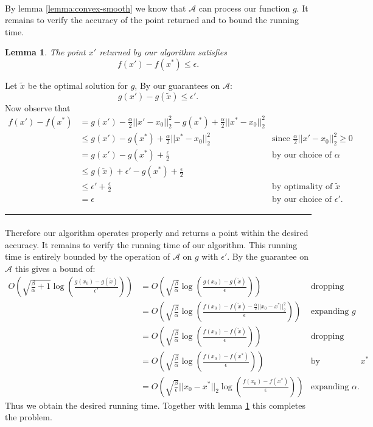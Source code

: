 \documentclass[letterpaper,12pt,oneside,onecolumn]{article}
\newcommand{\cA}{\mathcal{A}} \newcommand{\cB}{\mathcal{B}}
\newenvironment{proof}{{\bf Proof:  }}{\hfill\rule{2mm}{2mm}}
\newtheorem{lemma}[fact]{Lemma}
\begin{document}
\paragraph{}
By lemma \ref{lemma:convex-smooth} we know that $\cA$ can process our function $g$. It remains to verify the accuracy of the point returned and to bound the running time.
\begin{lemma}\label{lemma:q3-accuracy}
The point $x'$ returned by our algorithm satisfies
$$f(x') - f(x^*) \leq \epsilon.$$
\end{lemma}
\begin{proof}
Let $\tilde{x}$ be the optimal solution for $g$, By our guarantees on $\cA$:
$$g(x') - g(\tilde{x}) \leq \epsilon'.$$
Now observe that
\begin{align*}
f(x') - f(x^*) &= g(x') - \frac{\alpha}{2}||x'-x_0||^2_2 - g(x^*) +\frac{\alpha}{2}||x^*-x_0||_2^2 \\
&\leq g(x') - g(x^*) + \frac{\alpha}{2}||x^*-x_0||_2^2 &\text{since $\frac{\alpha}{2}||x'-x_0||^2_2\geq 0$} \\
&= g(x') - g(x^*) + \frac{\epsilon}{2} &\text{by our choice of $\alpha$} \\
&\leq g(\tilde{x}) + \epsilon' -g(x^*) + \frac{\epsilon}{2} \\
&\leq \epsilon' +\frac{\epsilon}{2} &\text{by optimality of $\tilde{x}$} \\
&= \epsilon &\text{by our choice of $\epsilon'$}.
\end{align*}
\end{proof}
\paragraph{}
Therefore our algorithm operates properly and returns a point within the desired accuracy. It remains to verify the running time of our algorithm. This running time is entirely bounded by the operation of $\cA$ on $g$ with $\epsilon'$. By the guarantee on $\cA$ this gives a bound of:
\begin{align*}
O(\sqrt{\frac{\beta}{\alpha} + 1}\log (\frac{g(x_0)-g(\tilde{x})}{\epsilon'})) &= O(\sqrt{\frac{\beta}{\alpha}}\log (\frac{g(x_0)-g(\tilde{x})}{\epsilon})) &\text{dropping constants}\\
&= O(\sqrt{\frac{\beta}{\alpha}}\log (\frac{f(x_0)-f(\tilde{x}) - \frac{\alpha}{2}||x_0-x^*||^2_2}{\epsilon})) &\text{expanding $g$}\\
&= O(\sqrt{\frac{\beta}{\alpha}}\log (\frac{f(x_0)-f(\tilde{x})}{\epsilon})) &\text{dropping non-positive term} \\
&= O(\sqrt{\frac{\beta}{\alpha}}\log (\frac{f(x_0)-f(x^*)}{\epsilon})) &\text{by optimality of $x^*$} \\
&= O(\sqrt{\frac{\beta}{\epsilon}} ||x_0-x^*||_2\log (\frac{f(x_0)-f(x^*)}{\epsilon}))  &\text{expanding $\alpha$}.
\end{align*}
Thus we obtain the desired running time. Together with lemma \ref{lemma:q3-accuracy} this completes the problem.
\end{document}
